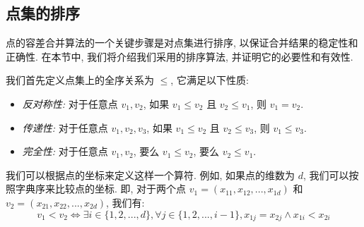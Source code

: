 
\subsection{点集的排序}



点的容差合并算法的一个关键步骤是对点集进行排序, 以保证合并结果的稳定性和正确性.
在本节中, 我们将介绍我们采用的排序算法, 并证明它的必要性和有效性.

我们首先定义点集上的全序关系为 $\leqslant$, 它满足以下性质:
\begin{itemize}
  \item \emph{反对称性:} 对于任意点 $v_1, v_2$, 如果 $v_1 \leqslant v_2$ 且 $v_2 \leqslant v_1$, 则 $v_1 = v_2$.
  \item \emph{传递性:} 对于任意点 $v_1, v_2, v_3$, 如果 $v_1 \leqslant v_2$ 且 $v_2 \leqslant v_3$, 则 $v_1 \leqslant v_3$.
  \item \emph{完全性:} 对于任意点 $v_1, v_2$, 要么 $v_1 \leqslant v_2$, 要么 $v_2 \leqslant v_1$.
\end{itemize}

我们可以根据点的坐标来定义这样一个算符.
例如, 如果点的维数为 $d$, 我们可以按照字典序来比较点的坐标.
即, 对于两个点 $v_1 = (x_{11}, x_{12}, ..., x_{1d})$ 和 $v_2 = (x_{21}, x_{22}, ..., x_{2d})$, 我们有:
\begin{equation*}
  v_1 < v_2 \iff \exists i \in \{1, 2, ..., d\}, \forall j \in \{1, 2, ..., i-1\}, x_{1j} = x_{2j} \land x_{1i} < x_{2i}
\end{equation*}

